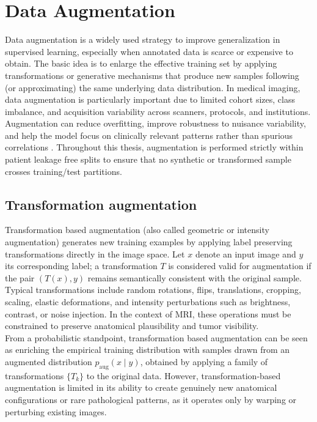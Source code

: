 \section{Data Augmentation}

Data augmentation is a widely used strategy to improve generalization in supervised learning, especially when annotated data is scarce or expensive to obtain. The basic idea is to enlarge the effective training set by applying transformations or generative mechanisms that produce new samples following (or approximating) the same underlying data distribution. In medical imaging, data augmentation is particularly important due to limited cohort sizes, class imbalance, and acquisition variability across scanners, protocols, and institutions. Augmentation can reduce overfitting, improve robustness to nuisance variability, and help the model focus on clinically relevant patterns rather than spurious correlations \cite{kumar2025enhancingimageclassificationaugmentation}. Throughout this thesis, augmentation is performed strictly within patient leakage free splits to ensure that no synthetic or transformed sample crosses training/test partitions.

\subsection{Transformation augmentation}

Transformation based augmentation (also called geometric or intensity augmentation) generates new training examples by applying label preserving transformations directly in the image space. Let $x$ denote an input image and $y$ its corresponding label; a transformation $T$ is considered valid for augmentation if the pair $(T(x), y)$ remains semantically consistent with the original sample. Typical transformations include random rotations, flips, translations, cropping, scaling, elastic deformations, and intensity perturbations such as brightness, contrast, or noise injection. In the context of MRI, these operations must be constrained to preserve anatomical plausibility and tumor visibility.\\

From a probabilistic standpoint, transformation based augmentation can be seen as enriching the empirical training distribution with samples drawn from an augmented distribution $p_{\mathrm{aug}}(x \mid y)$, obtained by applying a family of transformations $\{T_k\}$ to the original data. However, transformation-based augmentation is limited in its ability to create genuinely new anatomical configurations or rare pathological patterns, as it operates only by warping or perturbing existing images.

